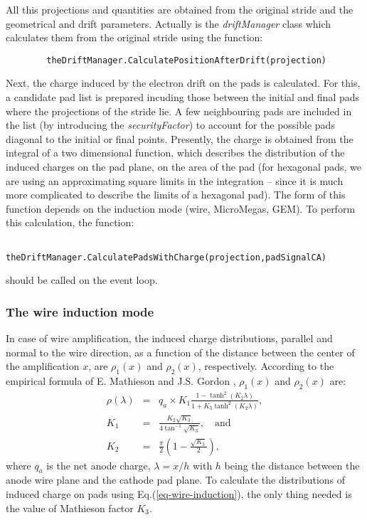All this projections and quantities are obtained from the original stride and the geometrical and drift parameters. Actually is the \textit{driftManager} class which calculates them from the original stride using the function:
\begin{verbatim} 
        theDriftManager.CalculatePositionAfterDrift(projection)
\end{verbatim}

Next, the charge induced by the electron drift on the pads is calculated. For this, a candidate pad list is prepared incuding those between the initial and final pads where the projections of the stride lie. A few neighbouring pads are included in the list (by introducing the \textit{securityFactor}) to account for the possible pads diagonal to the initial or final points. Presently, the charge is obtained from the integral of a two dimensional function, which describes the distribution of the induced charges on the pad plane, on the area of the pad (for hexagonal pads, we are using an approximating square limits in the integration -- since it is much more complicated to describe the limits of a hexagonal pad). The form of this function depends on the induction mode (wire, MicroMegas, GEM).
To perform this calculation, the function:
\begin{verbatim}
        theDriftManager.CalculatePadsWithCharge(projection,padSignalCA)
\end{verbatim}
should be called on the event loop.

\subsubsection{The wire induction mode}
In case of wire amplification, the induced charge distributions, parallel and normal to the wire direction, as a function of the distance between the center of the amplification $x$, are $\rho_1(x)$ and $\rho_2(x)$, respectively. According to the empirical formula of E. Mathieson and J.S. Gordon \cite{Mathieson-NIM-1984, Mathieson-NIMA-1988}, $\rho_1(x)$ and $\rho_2(x)$ are:
\begin{eqnarray}\label{eq-wire-induction}
 \rho(\lambda) &=& q_a\times{}K_1\frac{1-\tanh^2(K_2\lambda)}{1+K_3\tanh^2(K_2\lambda)},\nonumber\\
 K_1 &=& \frac{K_2\sqrt{K_3}}{4\tan^{-1}\sqrt{K_3}},\quad\textrm{and}\\
 K_2 &=& \frac{\pi}{2}\left(1-\frac{\sqrt{K_3}}{2}\right)\nonumber,
\end{eqnarray}
where $q_a$ is the net anode charge, $\lambda=x/h$ with $h$ being the distance between the anode wire plane and the cathode pad plane. To calculate the distributions of induced charge on pads using Eq.(\ref{eq-wire-induction}), the only thing needed is the value of Mathieson factor $K_3$.

